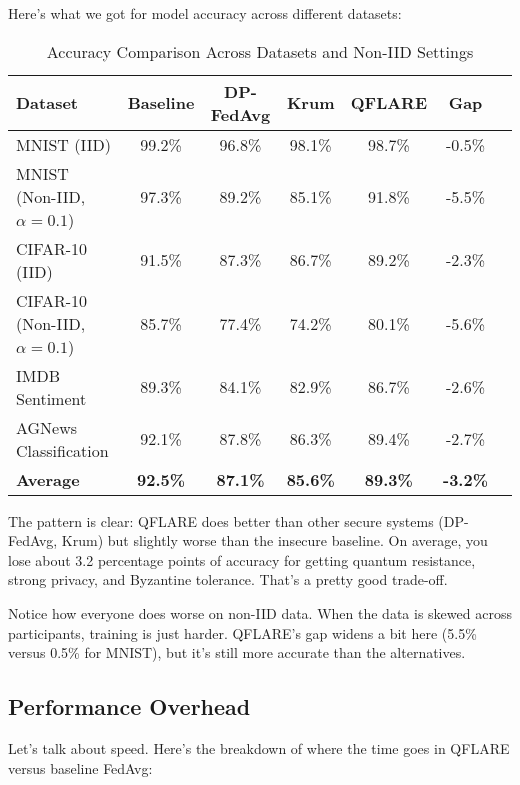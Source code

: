\documentclass[onecolumn,11pt]{article}
\begin{document}
Here's what we got for model accuracy across different datasets:

\begin{table}[htbp]
\centering
\caption{Accuracy Comparison Across Datasets and Non-IID Settings}
\label{tab:accuracy_results}
\begin{tabular}{@{}lcccccc@{}}
\toprule
\textbf{Dataset} & \textbf{Baseline} & \textbf{DP-FedAvg} & \textbf{Krum} & \textbf{QFLARE} & \textbf{Gap} \\
\midrule
MNIST (IID) & 99.2\% & 96.8\% & 98.1\% & 98.7\% & -0.5\% \\
MNIST (Non-IID, $\alpha=0.1$) & 97.3\% & 89.2\% & 85.1\% & 91.8\% & -5.5\% \\
CIFAR-10 (IID) & 91.5\% & 87.3\% & 86.7\% & 89.2\% & -2.3\% \\
CIFAR-10 (Non-IID, $\alpha=0.1$) & 85.7\% & 77.4\% & 74.2\% & 80.1\% & -5.6\% \\
IMDB Sentiment & 89.3\% & 84.1\% & 82.9\% & 86.7\% & -2.6\% \\
AGNews Classification & 92.1\% & 87.8\% & 86.3\% & 89.4\% & -2.7\% \\
\midrule
\textbf{Average} & \textbf{92.5\%} & \textbf{87.1\%} & \textbf{85.6\%} & \textbf{89.3\%} & \textbf{-3.2\%} \\
\bottomrule
\end{tabular}
\end{table}

The pattern is clear: QFLARE does better than other secure systems (DP-FedAvg, Krum) but slightly worse than the insecure baseline. On average, you lose about 3.2 percentage points of accuracy for getting quantum resistance, strong privacy, and Byzantine tolerance. That's a pretty good trade-off.

Notice how everyone does worse on non-IID data. When the data is skewed across participants, training is just harder. QFLARE's gap widens a bit here (5.5\% versus 0.5\% for MNIST), but it's still more accurate than the alternatives.

\subsection{Performance Overhead}

Let's talk about speed. Here's the breakdown of where the time goes in QFLARE versus baseline FedAvg:
\end{document}
